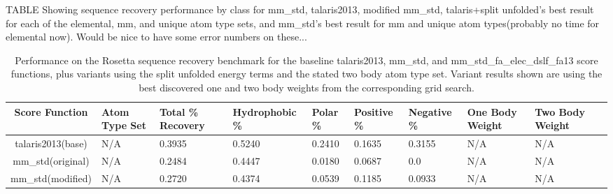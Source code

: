 TABLE Showing sequence recovery performance by class for mm\_std, talaris2013, modified mm\_std, talaris+split unfolded's best result for each of the elemental, mm, and unique atom type sets, and mm\_std's best result for mm and unique atom types(probably no time for elemental now). Would be nice to have some error numbers on these...

\begin{table}[!htbp]

\fontsize{9pt}{9pt}
\selectfont

\begin{tabular}{c|lllllllll}
Score Function & Atom Type Set & Total \% Recovery & Hydrophobic \% & Polar \% & Positive \% & Negative \% & One Body Weight & Two Body Weight\\
\hline
talaris2013(base) & N/A & 0.3935 & 0.5240 & 0.2410 & 0.1635 & 0.3155 & N/A & N/A\\
mm\_std(original) & N/A & 0.2484 & 0.4447 & 0.0180 & 0.0687 & 0.0 & N/A & N/A\\
mm\_std(modified) & N/A & 0.2720 & 0.4374 & 0.0539 & 0.1185 & 0.0933 & N/A & N/A\\
\end{tabular}

\fontsize{10pt}{11pt}
\selectfont
\caption{Performance on the Rosetta sequence recovery benchmark for the baseline talaris2013, mm\_std, and mm\_std\_fa\_elec\_dslf\_fa13 score functions, plus variants using the split unfolded energy terms and the stated two body atom type set. 
Variant results shown are using the best discovered one and two body weights from the corresponding grid search.}
\label{tab:performance}

\end{table}
